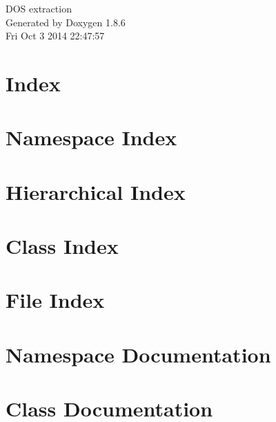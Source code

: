 \documentclass[twoside]{book}
\newcommand{\clearemptydoublepage}{%
  \newpage{\pagestyle{empty}\cleardoublepage}%
}
\begin{document}
\hypersetup{pageanchor=false}
\begin{titlepage}
\vspace*{7cm}
\begin{center}%
{\Large D\-O\-S extraction }\\
\vspace*{1cm}
{\large Generated by Doxygen 1.8.6}\\
\vspace*{0.5cm}
{\small Fri Oct 3 2014 22:47:57}\\
\end{center}
\end{titlepage}
\clearemptydoublepage
\tableofcontents
\clearemptydoublepage
{}
\hypersetup{pageanchor=true}

\chapter{Index}
\label{index}\hypertarget{index}{}
\chapter{Namespace Index}

\chapter{Hierarchical Index}

\chapter{Class Index}

\chapter{File Index}

\chapter{Namespace Documentation}



\chapter{Class Documentation}


















\end{document}
